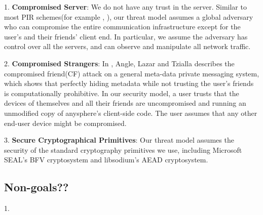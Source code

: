


1. \textbf{Compromised Server}: We do not have any trust in the server. Similar to most PIR schemes(for example \cite{ahmad2021addra}, ), our threat model assumes a global adversary who can compromise the entire communication infrastructure except for the user's and their friends' client end. In particular, we assume the adversary has control over all the servers, and can observe and manipulate all network traffic.

2. \textbf{Compromised Strangers}: In \cite{angel2018s}, Angle, Lazar and Tzialla describes the compromised friend(CF) attack on a general meta-data private messaging system, which shows that perfectly hiding metadata while not trusting the user's friends is computationally prohibitive. In our security model, a user trusts that the devices of themselves and all their friends are uncompromised and running an unmodified copy of anysphere's client-side code. The user assumes that any other end-user device might be compromised.

3. \textbf{Secure Cryptographical Primitives}: Our threat model assumes the security of the standard cryptography primitives we use, including Microsoft SEAL's BFV cryptosystem and libsodium's AEAD cryptosystem. 



\subsection{Non-goals??}
1. 


